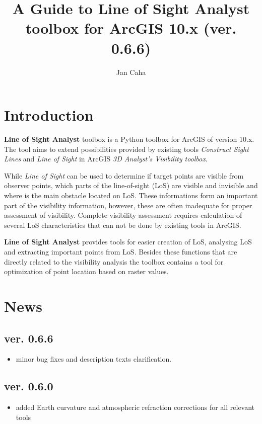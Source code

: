 \documentclass[]{article}
\title{A Guide to \textbf{Line of Sight Analyst} toolbox for ArcGIS 10.x (ver. 0.6.6)}
\author[*]{Jan Caha}
\affil[*]{email: \textit{jan.caha@outlook.com}}
\begin{document}
\maketitle

\setcounter{tocdepth}{2}
\tableofcontents

\section{Introduction}

\textbf{Line of Sight Analyst} toolbox is a Python toolbox for ArcGIS of version 10.x. The tool aims to extend possibilities provided by existing tools \textit{Construct Sight Lines} and \textit{Line of Sight} in ArcGIS \textit{3D Analyst's Visibility toolbox}.

While \textit{Line of Sight} can be used to determine if target points are visible from observer points, which parts of the line-of-sight (LoS) are visible and invisible and where is the main obstacle located on LoS. These informations form an important part of the visibility information, however, these are often inadequate for proper assessment of visibility. Complete visibility assessment requires calculation of several LoS characteristics that can not be done by existing tools in ArcGIS.

\textbf{Line of Sight Analyst} provides tools for easier creation of LoS, analysing LoS and extracting important points from LoS. Besides these functions that are directly related to the visibility analysis the toolbox contains a tool for optimization of point location based on raster values.

\section{News}

\subsection*{ver. 0.6.6}
\begin{itemize}
	\item minor bug fixes and description texts clarification.
\end{itemize}

\subsection*{ver. 0.6.0}
\begin{itemize}
	\item added Earth curvature and atmospheric refraction corrections for all relevant tools
\end{itemize}
\end{document}
